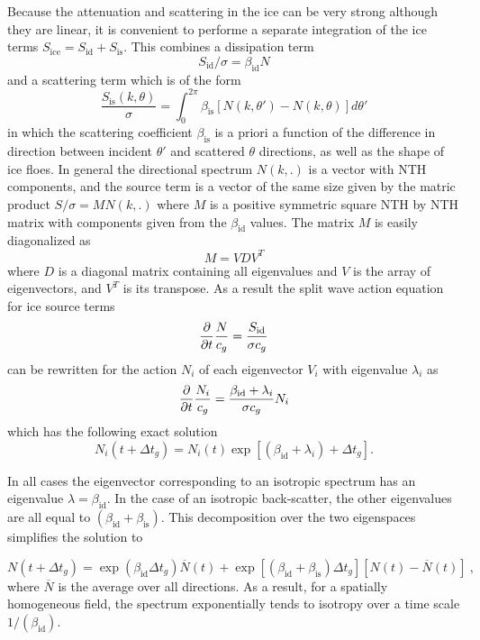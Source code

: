 Because the attenuation and scattering in the ice can be very strong although they are linear, it is convenient 
to performe a separate integration of the ice terms $S_{\mathrm{ice}}=S_{\mathrm{id}}+S_{\mathrm{is}}$. This combines 
a dissipation term 
\begin{equation}
S_{\mathrm{id}}/\sigma  = \beta_{\mathrm{id}} N 
\end{equation}
 and a scattering term 
which is of the form 
\begin{equation}
 \frac{S_{\mathrm{is}}(k,\theta)}{\sigma} =  \int_0^{2\pi}\beta_{\mathrm{is}} [N(k,\theta')-N(k,\theta)] d\theta'  
 \end{equation}
 in which the scattering coefficient $\beta_{\mathrm{is}}$ is a priori a function of the difference in direction between 
 incident $\theta'$ and scattered $\theta$ directions, as well as the shape of ice floes. In general 
  the directional spectrum $N(k,.)$ is a vector with {\F NTH} components, 
and the source term is a vector of the same size  given by the matric product $S/\sigma = M N(k,.)$ where  
$M$ is a positive symmetric square {\F NTH} by {\F NTH} matrix with components given from the $\beta_{\mathrm{id}}$ values.
The matrix $M$ is easily diagonalized as 
\begin{equation}
 M  =  V D V^T  
 \end{equation}
 where $D$ is a diagonal matrix containing all eigenvalues and $V$ is the array of eigenvectors, 
 and $V^T$ is its transpose. As a result the split wave action equation for ice source terms 
 \begin{equation}
\frac{\partial}{\partial t} \frac{N}{c_g}   = \frac{S_{\mathrm{id}}}{\sigma c_g} 
 \end{equation}
 can be rewritten for the action $N_i$ of each eigenvector $V_i$ with eigenvalue $\lambda_i$ as 
  \begin{equation}
\frac{\partial}{\partial t} \frac{N_i}{c_g}   = \frac{\beta_{\mathrm{id}} + \lambda_i}{\sigma c_g} N_i 
 \end{equation}
 which has the following exact solution 
   \begin{equation}
 {N_i}(t+\Delta t_g)   = N_i(t) \exp \left[ (\beta_{\mathrm{id}} + \lambda_i) +\Delta t_g\right].
 \end{equation}
 
 In all cases the eigenvector corresponding to an isotropic spectrum has an eigenvalue $\lambda=\beta_{\mathrm{id}}$. 
 In the case of an isotropic back-scatter, the other eigenvalues are all equal to $(\beta_{\mathrm{id}} + \beta_{\mathrm{is}})$. 
 This decomposition over the two eigenspaces simplifies the solution to 

\begin{equation}
 N(t+\Delta t_g) = \exp(\beta_{\mathrm{id}} \Delta t_g) \overline{N}(t)  + \exp \left[\left(\beta_{\mathrm{id}} + \beta_{\mathrm{is}}\right) \Delta t_g\right] \left[N(t)-\overline{N}(t)\right]
\: , \label{eq:exact_st_ice} \end{equation}
where $\overline{N}$ is the average over all directions. As a result, for a spatially homogeneous field, 
the spectrum exponentially tends to isotropy over a time scale $1/(\beta_{\mathrm{id}})$.
